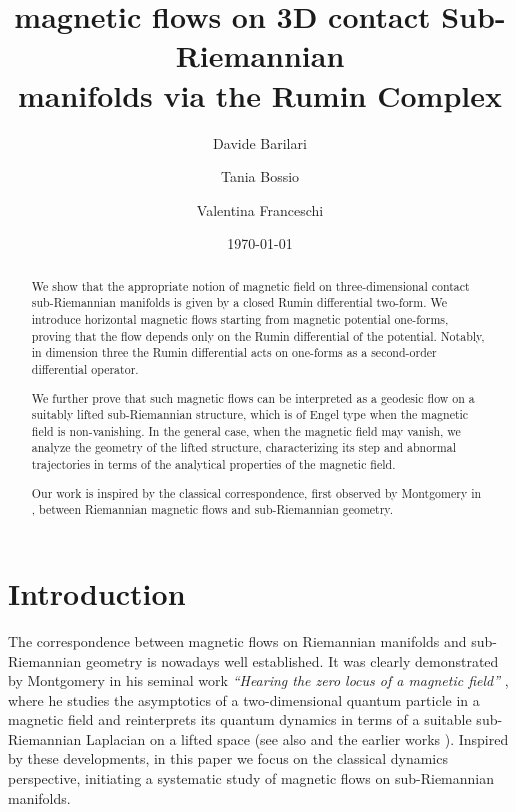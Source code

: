 \documentclass{amsart}
\title{ magnetic flows on 3D contact Sub-Riemannian\\ manifolds
via the Rumin Complex 
  }%
\date{\today}
\author{Davide Barilari}
\author{Tania Bossio}
\author{Valentina Franceschi}
\theoremstyle{plain}
\theoremstyle{definition}
\theoremstyle{remark}
\begin{document}
\begin{abstract} 


 We show that the appropriate  notion of magnetic field on three-dimensional contact sub-Riemannian manifolds is given by a closed Rumin differential two-form. 
We introduce horizontal magnetic flows starting from magnetic potential one-forms, proving that the flow depends only on the Rumin differential of the potential. Notably, in dimension three the Rumin differential acts on one-forms as a second-order differential operator.
 
 
 

We further prove that such magnetic flows can be interpreted as a geodesic flow on a suitably lifted sub-Riemannian structure, which is of Engel type when the magnetic field is non-vanishing.
In the general case, when the magnetic field may vanish, we analyze the geometry of the lifted structure, characterizing its step and abnormal trajectories in terms of the analytical properties of the magnetic field.

Our work is inspired by the classical correspondence, first observed by Montgomery in \cites{Mon90,MonZero}, between Riemannian magnetic flows and sub-Riemannian geometry.

\end{abstract}

\maketitle
\tableofcontents


\section{Introduction}
\label{s:intro}


The correspondence between magnetic flows on Riemannian manifolds and sub-Riemannian geometry is nowadays well established. It was clearly demonstrated by Montgomery in his seminal work \emph{``Hearing the zero locus of a magnetic field''} \cite{MonZero}, where he studies the asymptotics of a two-dimensional quantum particle in a magnetic field and reinterprets its quantum dynamics in terms of a suitable sub-Riemannian Laplacian on a lifted space (see also \cite[Chapter~12]{MonBook} and the earlier works \cites{Mon90,Mon94}). Inspired by these developments, in this paper we focus on the classical dynamics perspective, initiating a systematic study of magnetic flows on sub-Riemannian manifolds. 
\end{document}
